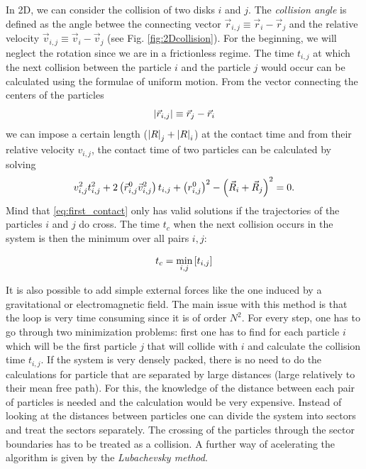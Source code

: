 In 2D, we can consider the collision of two disks $i$ and $j$. The \emph{collision angle} is defined as the angle betwee the connecting vector $\vec{r}_{i,j} \equiv \vec{r}_i-\vec{r}_j$ and the relative velocity $\vec{v}_{i,j} \equiv \vec{v}_i-\vec{v}_j$ (see Fig. \ref{fig:2Dcollision}). For the beginning, we will neglect the rotation since we are in a frictionless regime. The time $t_{i,j}$ at which the next collision between the particle $i$ and the particle $j$ would occur can be calculated using the formulae of uniform motion. From the vector connecting the centers of the particles
\begin{equation}
\left|\vec{r}_{i,j}\right| \equiv \vec{r}_j-\vec{r}_i
\end{equation}
we can impose a certain length ($ \left|R\right|_j+\left|R\right|_i$) at the contact time and from their relative velocity ${v}_{i,j}$, the contact time of two particles can be calculated by solving 
\begin{equation}
{v}_{i,j}^2{t}_{i,j}^2 + 2\left(\vec{r}_{i,j}^0 \vec{v}_{i,j}^2\right){t}_{i,j} + \left({r}_{i,j}^0\right)^2 -\left( \vec{R}_i+\vec{R}_j\right)^2=0.
\label{eq:first_contact} 
\end{equation}
Mind that \eqref{eq:first_contact} only has valid solutions if the trajectories of the particles $i$ and $j$ do cross. The time $t_c$ when the next collision occurs in the system is then the minimum over all pairs $i,j$:

\begin{equation}
t_c=\underset{i,j}{\text{min}}\left[t_{i,j}\right]
\end{equation}

It is also possible to add simple external forces like the one induced by a gravitational or electromagnetic field. The main issue with this method is that the loop is very time consuming since it is of order $N^2$. For every step, one has to go through two minimization problems: first one has to find for each particle $i$ which will be the first particle $j$ that will collide with $i$ and calculate the collision time $t_{i,j}$.  If the system is very densely packed, there is no need to do the calculations for particle that are separated by large distances (large relatively to their mean free path). For this, the knowledge of the distance between each pair of particles is needed and the calculation would be very expensive. Instead of looking at the distances between particles one can divide the system into sectors and treat the sectors separately. The crossing of the particles through the sector boundaries has to be treated as a collision.
A further way of acelerating the algorithm is given by the \emph{Lubachevsky method}.





